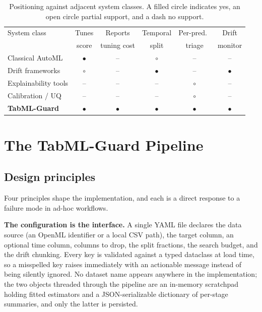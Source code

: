 \documentclass{ieeeaccess}
\begin{document}
\begin{table}[t]
\caption{Positioning against adjacent system classes. A filled circle indicates yes, an open circle partial support, and a dash no support.}
\label{tab:positioning}
\centering
\footnotesize
\setlength{\tabcolsep}{3pt}
\begin{tabular}{lccccc}
\toprule
System class & Tunes & Reports & Temporal & Per-pred.\ & Drift \\
             & score & tuning cost & split & triage & monitor \\
\midrule
Classical AutoML \cite{feurer2015auto,kotthoff2013auto,olson2016tpot,erickson2020autogluon} & $\bullet$ & -- & $\circ$ & -- & -- \\
Drift frameworks \cite{gama2014survey} & $\circ$ & -- & $\bullet$ & -- & $\bullet$ \\
Explainability tools \cite{lundberg2017unified,ribeiro2016lime} & -- & -- & -- & $\circ$ & -- \\
Calibration / UQ \cite{guo2017calibration,gal2016dropout} & -- & -- & -- & $\circ$ & -- \\
\textbf{TabML-Guard} & $\bullet$ & $\bullet$ & $\bullet$ & $\bullet$ & $\bullet$ \\
\bottomrule
\end{tabular}
\end{table}

\section{The TabML-Guard Pipeline}
\label{sec:method}

\subsection{Design principles}
Four principles shape the implementation, and each is a direct response to a failure mode in ad-hoc workflows.

\textbf{The configuration is the interface.} A single YAML file declares the data source (an OpenML identifier or a local CSV path), the target column, an optional time column, columns to drop, the split fractions, the search budget, and the drift chunking. Every key is validated against a typed dataclass at load time, so a misspelled key raises immediately with an actionable message instead of being silently ignored. No dataset name appears anywhere in the implementation; the two objects threaded through the pipeline are an in-memory scratchpad holding fitted estimators and a JSON-serializable dictionary of per-stage summaries, and only the latter is persisted.
\end{document}
